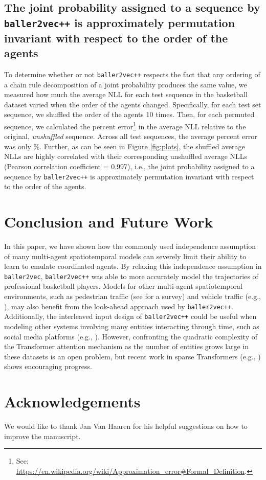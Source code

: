\documentclass{article}
\newcommand{\btv}{\texttt{baller2vec}}
\newcommand{\btvpp}{\texttt{baller2vec++}}
\begin{document}
\subsection{The joint probability assigned to a sequence by \btvpp{} is approximately permutation invariant with respect to the order of the agents}\label{sec:permutation}

To determine whether or not \btvpp{} respects the fact that any ordering of a chain rule decomposition of a joint probability produces the same value, we measured how much the average NLL for each test sequence in the basketball dataset varied when the order of the agents changed.
Specifically, for each test set sequence, we shuffled the order of the agents 10 times.
Then, for each permuted sequence, we calculated the percent error\footnote{See: \url{https://en.wikipedia.org/wiki/Approximation_error\#Formal_Definition}.} in the average NLL relative to the original, \textit{unshuffled} sequence.
Across all test sequences, the average percent error was only \%.
Further, as can be seen in Figure \ref{fig:plots}, the shuffled average NLLs are highly correlated with their corresponding unshuffled average NLLs (Pearson correlation coefficient = 0.997), i.e., the joint probability assigned to a sequence by \btvpp{} is approximately permutation invariant with respect to the order of the agents. 
\section{Conclusion and Future Work}\label{sec:conclusion}
In this paper, we have shown how the commonly used independence assumption of many multi-agent spatiotemporal models can severely limit their ability to learn to emulate coordinated agents.
By relaxing this independence assumption in \btv{}, \btvpp{} was able to more accurately model the trajectories of professional basketball players.
Models for other multi-agent spatiotemporal environments, such as pedestrian traffic (see \cite{rudenko2020human} for a survey) and vehicle traffic (e.g., \cite{deo2018convolutional, Chang_2019_CVPR, Zhao_2019_CVPR, Chandra_2019_CVPR}), may also benefit from the look-ahead approach used by \btvpp{}.
Additionally, the interleaved input design of \btvpp{} could be useful when modeling other systems involving many entities interacting through time, such as social media platforms (e.g., \cite{tgn_icml_grl2020}).
However, confronting the quadratic complexity of the Transformer attention mechanism as the number of entities grows large in these datasets is an open problem, but recent work in sparse Transformers (e.g., \cite{child2019generating, NEURIPS2020_c8512d14, beltagy2020longformer, Kitaev2020Reformer:}) shows encouraging progress. 
\section{Acknowledgements}
We would like to thank Jan Van Haaren for his helpful suggestions on how to improve the manuscript.



\end{document}
